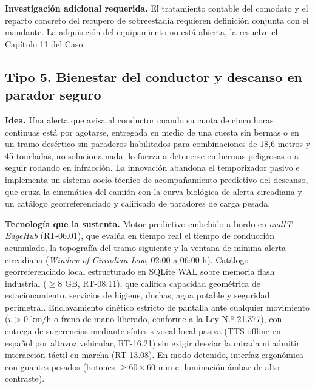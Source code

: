 \textbf{Investigación adicional requerida.} El tratamiento contable del comodato y el reparto
concreto del recupero de sobreestadía requieren definición conjunta con el mandante. La adquisición
del equipamiento no está abierta, la resuelve el Capítulo 11 del Caso.

\subsection{Tipo 5. Bienestar del conductor y descanso en parador seguro}

\textbf{Idea.} Una alerta que avisa al conductor cuando su cuota de cinco horas continuas está por agotarse, entregada en medio de una cuesta sin bermas o en un tramo desértico sin paraderos habilitados para combinaciones de 18,6 metros y 45 toneladas, no soluciona nada: lo fuerza a detenerse en bermas peligrosas o a seguir rodando en infracción. La innovación abandona el temporizador pasivo e implementa un sistema socio-técnico de acompañamiento predictivo del descanso, que cruza la cinemática del camión con la curva biológica de alerta circadiana y un catálogo georreferenciado y calificado de paradores de carga pesada.

\textbf{Tecnología que la sustenta.} Motor predictivo embebido a bordo en \textit{audIT EdgeHub} (RT-06.01), que evalúa en tiempo real el tiempo de conducción acumulado, la topografía del tramo siguiente y la ventana de mínima alerta circadiana (\textit{Window of Circadian Low}, 02:00 a 06:00 h). Catálogo georreferenciado local estructurado en SQLite WAL sobre memoria flash industrial ($\ge 8\text{ GB}$, RT-08.11), que califica capacidad geométrica de estacionamiento, servicios de higiene, duchas, agua potable y seguridad perimetral. Enclavamiento cinético estricto de pantalla ante cualquier movimiento ($v > 0\text{ km/h}$ o freno de mano liberado, conforme a la Ley N.º 21.377), con entrega de sugerencias mediante síntesis vocal local pasiva (TTS offline en español por altavoz vehicular, RT-16.21) sin exigir desviar la mirada ni admitir interacción táctil en marcha (RT-13.08). En modo detenido, interfaz ergonómica con guantes pesados (botones $\ge 60\times 60\text{ mm}$ e iluminación ámbar de alto contraste).


